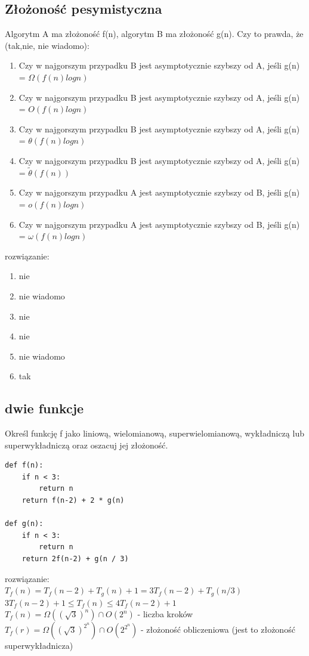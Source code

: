 \documentclass{article}
\begin{document}
\subsection*{Złożoność pesymistyczna}
Algorytm A ma złożoność f(n), algorytm B ma złożoność g(n). Czy to prawda, że (tak,nie, nie wiadomo):
\begin{enumerate}
	\item Czy w najgorszym przypadku B jest asymptotycznie szybszy od A, jeśli g(n) = $\Omega(f(n)logn)$
	\item Czy w najgorszym przypadku B jest asymptotycznie szybszy od A, jeśli g(n) = $O(f(n)logn)$
	\item Czy w najgorszym przypadku B jest asymptotycznie szybszy od A, jeśli g(n) = $\theta(f(n)logn)$
	\item Czy w najgorszym przypadku B jest asymptotycznie szybszy od A, jeśli g(n) = $\tilde\theta(f(n))$
	\item Czy w najgorszym przypadku A jest asymptotycznie szybszy od B, jeśli g(n) = $o(f(n)logn)$
	\item Czy w najgorszym przypadku A jest asymptotycznie szybszy od B, jeśli g(n) = $\omega(f(n)logn)$
\end{enumerate}
rozwiązanie: \\
\begin{enumerate}
	\item nie
	\item nie wiadomo
	\item nie
	\item nie
	\item nie wiadomo
	\item tak
\end{enumerate}

\subsection*{dwie funkcje}

Określ funkcję f jako liniową, wielomianową, superwielomianową, wykładniczą lub superwykładniczą oraz oszacuj jej złożoność.
\begin{lstlisting}
def f(n):
	if n < 3:
		return n
	return f(n-2) + 2 * g(n)
	
def g(n):
	if n < 3:
		return n
	return 2f(n-2) + g(n / 3)
\end{lstlisting}
rozwiązanie: \\
$T_f(n) = T_f(n-2) + T_g(n) + 1 = 3T_f(n-2) + T_g(n/3)$ \\
$3T_f(n-2) + 1 \leq T_f(n) \leq 4T_f(n-2) + 1$ \\
$T_f(n) = \Omega((\sqrt 3)^n) \cap O(2^n)$ - liczba kroków \\
$T_f(r) = \Omega((\sqrt 3)^{2^n}) \cap O(2^{2^n})$ - złożoność obliczeniowa (jest to złożoność superwykładnicza)
\end{document}
